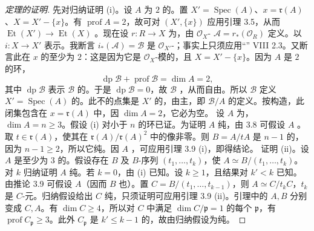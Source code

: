 \begin{proof}[定理的证明]
先对归纳证明 (i)。设 $A$ 为 $2$ 的。置 $X'=\operatorname{Spec}(A)$、$x=\mathfrak r(A)$、$X=X'-\{x\}$。有 $\operatorname{prof}A=2$，故可对 $(X',\{x\})$ 应用引理 3.5，从而 $\operatorname{Et}(X')\to\operatorname{Et}(X)$ 。现在设 $r:R\to X$ 为，由 $\mathcal O_X$- $\mathcal A=r_*(\mathcal O_R)$ 定义。以 $i:X\to X'$ 表示。我断言 $i_*(\mathcal A)=\mathcal B$ 是 $\mathcal O_{X'}$-；事实上只须应用“” VIII 2.3。又断言此在 $x$ 的至少为 $2$：这是因为它是 $\mathcal O_X$-模的，且 $X=X'-\{x\}$。因为 $A$ 是 $2$ 的环，
\[\operatorname{dp}\mathcal B+\operatorname{prof}\mathcal B=\dim A=2,\]
其中 $\operatorname{dp}\mathcal B$ 表示 $\mathcal B$ 的。于是 $\operatorname{dp}\mathcal B=0$，故 $\mathcal B$ ，从而自由。所以 $\mathcal B$ 定义 $X'=\operatorname{Spec}(A)$ 的。此不的点集是 $X'$ 的，由主，即 $\mathcal B/A$ 的定义。按构造，此闭集包含在 $x=\mathfrak r(A)$ 中，因 $\dim A=2$，它必为空。
设 $A$ 为，$\dim A=n\geq3$。假设 (i) 对小于 $n$ 的环已证。为证明 $A$ 纯，由 3.8 可假设 $A$ 。取 $t\in\mathfrak r(A)$，使其在 $\mathfrak r(A)/\mathfrak r(A)^2$ 中的像非零。则 $B=A/tA$ 是 $n-1$ 的，因为 $n-1\geq2$，所以它纯。因 $A$ ，可应用引理 3.9 (i)，即得结论。
证明 (ii)。设 $A$ 是至少为 $3$ 的。假设存在 $B$ 及 $B$-序列 $(t_1,\ldots,t_k)$，使 $A\simeq B/(t_1,\ldots,t_k)$。对 $k$ 归纳证明 $A$ 纯。若 $k=0$，由 (i) 已知。设 $k\geq1$，且结果对 $k'<k$ 已知。由推论 3.9 可假设 $A$（因而 $B$ 也）。置 $C=B/(t_1,\ldots,t_{k-1})$，则 $A\simeq C/t_kC$，$t_k$ 是 $C$-元。归纳假设给出 $C$ 纯，只须证明可应用引理 3.9 (ii)。引理中的 $A,B$ 分别变成 $C,A$。有 $\dim C\geq4$，所以对 $C$ 中满足 $\dim C/\mathfrak p=1$ 的每个 $\mathfrak p$，有 $\operatorname{prof}C_{\mathfrak p}\geq3$。此外 $C_{\mathfrak p}$ 是 $k'\leq k-1$ 的，故由归纳假设为纯。
\end{proof}
